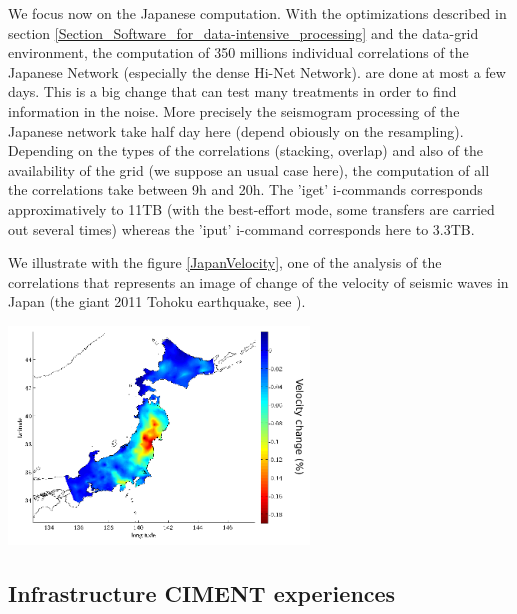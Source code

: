 \documentclass[a4paper, 10pt]{article}
\begin{document}
\begin{multicols}{2}
We focus now on the Japanese computation. With the optimizations described in section \ref{Section_Software_for_data-intensive_processing} 
and the data-grid environment, the computation of 350 millions individual correlations of the Japanese Network (especially the dense Hi-Net Network). 
are done at most a few days. This is a big change that can test many treatments in order to find information in the noise.
More precisely the seismogram processing of the Japanese network take half day here (depend obiously on the resampling).
Depending on the types of the correlations (stacking, overlap) and also of the availability of the grid (we suppose an usual case here), 
the computation of all the correlations take between 9h and 20h. The 'iget' i-commands corresponds approximatively to 11TB (with the best-effort mode,
some transfers are carried out several times) whereas the 'iput' i-command corresponds here to 3.3TB. 


We illustrate with the figure \ref{JapanVelocity}, one of the analysis of the correlations that represents an image
of change of the velocity of seismic waves in Japan (the giant 2011 Tohoku earthquake, see \cite{key:BCTASBEM}).
\begin{center}%
\centering
{}
\includegraphics[width=8cm]{JapanVelocity.png}
\end{center}


\subsection{Infrastructure CIMENT experiences}


\end{multicols}
\end{document}
